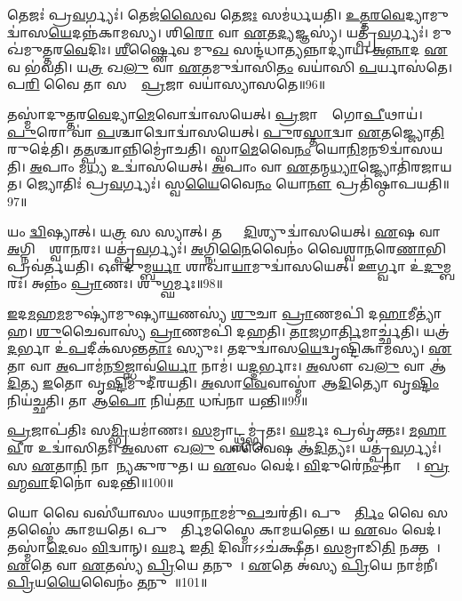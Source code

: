 𑌤𑍇𑌜𑌃॑ 𑌪𑍍𑌰\ul{𑌵}𑌰𑍍𑌗𑍍𑌯𑌃॑। 
𑌤𑍇𑌜॑\ul{𑌸𑍈}𑌵 𑌤𑍇\ul{𑌜𑌃} 𑌸𑌮॑𑌰𑍍𑌧𑌯𑌤𑌿। 
\ul{𑌉}\ul{𑌤𑍍𑌤}\ul{𑌰}\ul{𑌵𑍇}𑌦𑍍𑌯𑌾𑌮𑍁𑌦𑍍𑌵𑌾॑𑌸\ul{𑌯𑍇}\-𑌦𑌨𑍍𑌨॑\-𑌕𑌾𑌮𑌸𑍍𑌯। 
𑌶𑌿\ul{𑌰𑍋} 𑌵𑌾 \ul{𑌏}𑌤\ul{𑌦𑍍𑌯}𑌜𑍍𑌞𑌸𑍍𑌯॑। 
𑌯𑌤𑍍𑌪𑍍𑌰॑\ul{𑌵}𑌰𑍍𑌗𑍍𑌯𑌃॑। 
𑌮𑍁𑌖॑𑌮𑍁𑌤𑍍𑌤𑌰\ul{𑌵𑍇}𑌦𑌿𑌃। 
\ul{𑌶𑍀}𑌰𑍍𑌷𑍍𑌣𑍈𑌵 𑌮𑍁\ul{𑌖}\ul{} 𑌸𑌨𑍍𑌦॑𑌧𑌾\ul{𑌤𑍍𑌯}𑌨𑍍𑌨𑌾𑌦𑍍𑌯𑌾॑𑌯। 
\ul{𑌅}\ul{𑌨𑍍𑌨𑌾}𑌦 \ul{𑌏}𑌵 𑌭॑𑌵𑌤𑌿। 
𑌯\ul{𑌤𑍍𑌰} 𑌖\ul{𑌲𑍁} 𑌵𑌾 \ul{𑌏}𑌤𑌮𑍁𑌦𑍍𑌵𑌾॑𑌸𑌿\ul{𑌤𑌂} 𑌵𑌯𑌾॑𑌸𑌿 \ul{𑌪}𑌰𑍍𑌯𑌾𑌸॑𑌤𑍇। 
𑌪\ul{𑌰𑌿} 𑌵𑍈 𑌤𑌾 𑌸𑌮𑌾𑌂᳚ \ul{𑌪𑍍𑌰}𑌜𑌾 𑌵𑌯𑌾॑𑌸𑍍𑌯𑌾𑌸𑌤𑍇॥96॥

𑌤𑌸𑍍𑌮𑌾॑𑌦𑍁𑌤𑍍𑌤𑌰\ul{𑌵𑍇}𑌦𑍍𑌯𑌾\ul{𑌮𑍇}𑌵𑍋𑌦𑍍𑌵𑌾॑𑌸𑌯𑍇𑌤𑍍। 
\ul{𑌪𑍍𑌰}𑌜𑌾𑌨𑌾𑌂᳚ 𑌗𑍋\ul{𑌪𑍀}𑌥𑌾𑌯॑। 
\ul{𑌪𑍁}𑌰𑍋 𑌵𑌾॑ \ul{𑌪}𑌶𑍍𑌚𑌾𑌦𑍍𑌵𑍋𑌦𑍍𑌵𑌾॑𑌸𑌯𑍇𑌤𑍍। 
\ul{𑌪𑍁}𑌰\ul{𑌸𑍍𑌤𑌾}𑌦𑍍𑌵𑌾 \ul{𑌏}𑌤𑌜𑍍𑌜𑍍𑌯𑍋\ul{𑌤𑌿}𑌰𑍁𑌦𑍇॑𑌤𑌿। 
𑌤\ul{𑌤𑍍𑌪}𑌶𑍍𑌚𑌾𑌨𑍍𑌨𑌿𑌮𑍍𑌰𑍋॑𑌚𑌤𑌿। 
𑌸𑍍𑌵𑌾\ul{𑌮𑍇}𑌵𑍈\ul{𑌨𑌂} 𑌯𑍋\ul{𑌨𑌿}𑌮𑌨𑍂𑌦𑍍𑌵𑌾॑𑌸𑌯𑌤𑌿। 
\ul{𑌅}𑌪𑌾𑌂 𑌮\ul{𑌧𑍍𑌯} 𑌉𑌦𑍍𑌵𑌾॑𑌸𑌯𑍇𑌤𑍍। 
\ul{𑌅}𑌪𑌾𑌂 𑌵𑌾 \ul{𑌏}𑌤𑌨𑍍𑌮\ul{𑌧𑍍𑌯𑌾}𑌜𑍍𑌜𑍍𑌯𑍋𑌤𑌿॑𑌰𑌜𑌾𑌯𑌤। 
𑌜𑍍𑌯𑍋𑌤𑌿𑌃॑ 𑌪𑍍𑌰\ul{𑌵}𑌰𑍍𑌗𑍍𑌯𑌃॑। 
𑌸𑍍𑌵\ul{𑌯𑍈}𑌵𑍈\ul{𑌨𑌂} 𑌯𑍋\ul{𑌨𑍗} 𑌪𑍍𑌰𑌤𑌿॑𑌷𑍍𑌠𑌾𑌪𑌯𑌤𑌿॥97॥

𑌯𑌂 \ul{𑌦𑍍𑌵𑌿}𑌷𑍍𑌯𑌾𑌤𑍍। 
𑌯\ul{𑌤𑍍𑌰} 𑌸 𑌸𑍍𑌯𑌾𑌤𑍍। 
𑌤𑌸𑍍𑌯𑌾𑌂᳚ \ul{𑌦𑌿}𑌶𑍍𑌯𑍁𑌦𑍍𑌵𑌾॑𑌸𑌯𑍇𑌤𑍍। 
\ul{𑌏}𑌷 𑌵𑌾 \ul{𑌅}𑌗𑍍𑌨𑌿𑌰𑍍𑌵𑍈᳚𑌶𑍍𑌵𑌾\ul{𑌨}𑌰𑌃। 
𑌯𑌤𑍍𑌪𑍍𑌰॑\ul{𑌵}𑌰𑍍𑌗𑍍𑌯𑌃॑। 
\ul{𑌅}𑌗𑍍𑌨𑌿\ul{𑌨𑍈}𑌵𑍈𑌨𑌂॑ 𑌵𑍈𑌶𑍍𑌵𑌾\ul{𑌨}𑌰𑍇\ul{𑌣𑌾}𑌭𑌿 𑌪𑍍𑌰𑌵॑𑌰𑍍𑌤𑌯𑌤𑌿। 
𑌔𑌦𑍁॑𑌮𑍍𑌬\ul{𑌰𑍍𑌯𑌾}\ul{} 𑌶𑌾𑌖𑌾॑\ul{𑌯𑌾}𑌮𑍁𑌦𑍍𑌵𑌾॑𑌸𑌯𑍇𑌤𑍍। 
𑌊𑌰𑍍𑌗𑍍𑌵𑌾 𑌉॑\ul{𑌦𑍁}𑌮𑍍𑌬𑌰𑌃॑। 
𑌅𑌨𑍍𑌨𑌂॑ \ul{𑌪𑍍𑌰𑌾}𑌣𑌃। 
𑌶𑍁\ul{𑌗𑍍𑌘}𑌰𑍍𑌮𑌃॥98॥

\ul{𑌇}𑌦\ul{𑌮}𑌹\ul{𑌮}𑌮𑍁𑌷𑍍𑌯𑌾॑𑌮𑍁𑌷𑍍𑌯𑌾\ul{𑌯}𑌣𑌸𑍍𑌯॑ \ul{𑌶𑍁}𑌚𑌾 \ul{𑌪𑍍𑌰𑌾}𑌣𑌮𑌪𑌿॑ 𑌦\ul{𑌹𑌾}𑌮𑍀𑌤𑍍𑌯𑌾॑𑌹। 
\ul{𑌶𑍁}𑌚𑍈𑌵𑌾𑌸𑍍𑌯॑ \ul{𑌪𑍍𑌰𑌾}𑌣𑌮𑌪𑌿॑ 𑌦𑌹𑌤𑌿। 
\ul{𑌤𑌾}𑌜𑌗𑌾\ul{𑌰𑍍𑌤𑌿}𑌮𑌾𑌰𑍍𑌚𑍍𑌛॑𑌤𑌿। 
𑌯𑌤𑍍𑌰॑ \ul{𑌦}𑌰𑍍𑌭𑌾 𑌉॑\ul{𑌪}𑌦𑍀𑌕॑𑌸𑌨𑍍𑌤\ul{𑌤𑌾𑌃} 𑌸𑍍𑌯𑍁𑌃। 
𑌤𑌦𑍁𑌦𑍍𑌵𑌾॑𑌸\ul{𑌯𑍇}𑌦𑍍𑌵𑍃𑌷𑍍𑌟𑌿॑𑌕𑌾𑌮𑌸𑍍𑌯। 
\ul{𑌏}𑌤𑌾 𑌵𑌾 \ul{𑌅}𑌪𑌾𑌮॑\ul{𑌨𑍂}𑌜𑍍𑌝𑌾𑌵॑\ul{𑌰𑍍𑌯𑍋} 𑌨𑌾𑌮॑। 
𑌯\ul{𑌦𑍍𑌦}𑌰𑍍𑌭𑌾𑌃। 
\ul{𑌅}𑌸𑍗 𑌖\ul{𑌲𑍁} 𑌵𑌾 𑌆॑\ul{𑌦𑌿}𑌤𑍍𑌯 \ul{𑌇}𑌤𑍋 𑌵𑍃\ul{𑌷𑍍𑌟𑌿}𑌮𑍁𑌦𑍀॑𑌰𑌯𑌤𑌿। 
\ul{𑌅}𑌸𑌾\ul{𑌵𑍇}𑌵𑌾𑌸𑍍𑌮𑌾॑ 𑌆\ul{𑌦𑌿}𑌤𑍍𑌯𑍋 𑌵𑍃\ul{𑌷𑍍𑌟𑌿𑌂} 𑌨𑌿𑌯॑𑌚𑍍𑌛𑌤𑌿। 
𑌤𑌾 𑌆\ul{𑌪𑍋} 𑌨𑌿𑌯॑\ul{𑌤𑌾} 𑌧𑌨𑍍𑌵॑𑌨𑌾 𑌯𑌨𑍍𑌤𑌿॥99॥
\anuvakamend[𑌗𑍋𑌃 𑌪𑌯॑ 𑌉𑌤𑍍𑌤𑌰\ul{𑌵𑍇}𑌦𑌿𑌰𑌾॑𑌸𑌤𑍇 𑌸𑍍𑌥𑌾𑌪𑌯𑌤𑌿 \ul{𑌘}𑌰𑍍𑌮𑍋 𑌯॑𑌨𑍍𑌤𑌿]

\ul{𑌪𑍍𑌰}𑌜𑌾𑌪॑𑌤𑌿𑌃 𑌸\ul{𑌮𑍍𑌭𑍍𑌰𑌿}𑌯𑌮𑌾॑𑌣𑌃। 
\ul{𑌸}𑌮𑍍𑌰𑌾𑌟𑍍𑌥𑍍𑌸𑌮𑍍𑌭𑍃॑𑌤𑌃। 
\ul{𑌘}𑌰𑍍𑌮𑌃 𑌪𑍍𑌰𑌵𑍃॑𑌕𑍍𑌤𑌃। 
\ul{𑌮}\ul{𑌹𑌾}\ul{𑌵𑍀}𑌰 𑌉𑌦𑍍𑌵𑌾॑𑌸𑌿𑌤𑌃। 
\ul{𑌅}𑌸𑍗 𑌖\ul{𑌲𑍁} 𑌵𑌾𑌵𑍈𑌷 𑌆॑\ul{𑌦𑌿}𑌤𑍍𑌯𑌃। 
𑌯𑌤𑍍𑌪𑍍𑌰॑\ul{𑌵}𑌰𑍍𑌗𑍍𑌯𑌃॑। 
𑌸 \ul{𑌏}𑌤𑌾\ul{𑌨𑌿} 𑌨𑌾𑌮𑌾᳚𑌨𑍍𑌯𑌕𑍁𑌰𑍁𑌤। 
𑌯 \ul{𑌏}𑌵𑌂 𑌵𑍇𑌦॑। 
\ul{𑌵𑌿}𑌦𑍁𑌰𑍇॑\ul{𑌨𑌂} 𑌨𑌾𑌮𑍍𑌨𑌾᳚। 
\ul{𑌬𑍍𑌰}\ul{𑌹𑍍𑌮}\ul{𑌵𑌾}𑌦𑌿𑌨𑍋॑ 𑌵𑌦𑌨𑍍𑌤𑌿॥100॥

𑌯𑍋 𑌵𑍈 𑌵𑌸𑍀॑𑌯𑌾𑌸𑌂 𑌯𑌥𑌾\ul{𑌨𑌾}𑌮𑌮𑍁॑\ul{𑌪}𑌚𑌰॑𑌤𑌿। 
𑌪𑍁𑌣𑍍𑌯𑌾᳚\ul{𑌰𑍍𑌤𑌿𑌂} 𑌵𑍈 𑌸 𑌤𑌸𑍍𑌮𑍈॑ 𑌕𑌾𑌮𑌯𑌤𑍇। 
𑌪𑍁𑌣𑍍𑌯𑌾᳚𑌰𑍍𑌤𑌿𑌮𑌸𑍍𑌮𑍈 𑌕𑌾𑌮𑌯𑌨𑍍𑌤𑍇। 
𑌯 \ul{𑌏}𑌵𑌂 𑌵𑍇𑌦॑। 
𑌤𑌸𑍍𑌮𑌾॑\ul{𑌦𑍇}𑌵𑌂  \ul{𑌵𑌿}𑌦𑍍𑌵𑌾𑌨𑍍। 
\ul{𑌘}𑌰𑍍𑌮 𑌇\ul{𑌤𑌿} 𑌦𑌿𑌵𑌾𑌽𑌽𑌚॑𑌕𑍍𑌷𑍀𑌤। 
\ul{𑌸}𑌮𑍍𑌰𑌾𑌡𑌿\ul{𑌤𑌿} 𑌨𑌕𑍍𑌤𑌮𑍍᳚। 
\ul{𑌏}𑌤𑍇 𑌵𑌾 \ul{𑌏}𑌤𑌸𑍍𑌯॑ \ul{𑌪𑍍𑌰𑌿}𑌯𑍇 \ul{𑌤}𑌨𑍁𑌵𑍗᳚। 
\ul{𑌏}𑌤𑍇 𑌅॑𑌸𑍍𑌯 \ul{𑌪𑍍𑌰𑌿}𑌯𑍇 𑌨𑌾𑌮॑𑌨𑍀। 
\ul{𑌪𑍍𑌰𑌿}𑌯\ul{𑌯𑍈}𑌵𑍈𑌨𑌂॑ \ul{𑌤}𑌨𑍁𑌵𑌾᳚॥101॥

